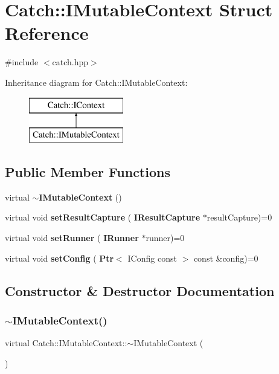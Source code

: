 \section{Catch\+:\+:I\+Mutable\+Context Struct Reference}
\label{struct_catch_1_1_i_mutable_context}


{\ttfamily \#include $<$catch.\+hpp$>$}

Inheritance diagram for Catch\+:\+:I\+Mutable\+Context\+:\begin{figure}[H]
\begin{center}
\leavevmode
\includegraphics[height=2.000000cm]{struct_catch_1_1_i_mutable_context}
\end{center}
\end{figure}
\subsection*{Public Member Functions}
\begin{DoxyCompactItemize}
\item 
virtual \textbf{ $\sim$\+I\+Mutable\+Context} ()
\item 
virtual void \textbf{ set\+Result\+Capture} (\textbf{ I\+Result\+Capture} $\ast$result\+Capture)=0
\item 
virtual void \textbf{ set\+Runner} (\textbf{ I\+Runner} $\ast$runner)=0
\item 
virtual void \textbf{ set\+Config} (\textbf{ Ptr}$<$ I\+Config const $>$ const \&config)=0
\end{DoxyCompactItemize}


\subsection{Constructor \& Destructor Documentation}
\mbox{\label{struct_catch_1_1_i_mutable_context_a93f32b2ab6d0fb83637059240be799ab}} 
\subsubsection{$\sim$\+I\+Mutable\+Context()}
{\footnotesize\ttfamily virtual Catch\+::\+I\+Mutable\+Context\+::$\sim$\+I\+Mutable\+Context (\begin{DoxyParamCaption}{ }\end{DoxyParamCaption})\hspace{0.3cm}{\ttfamily [virtual]}}



